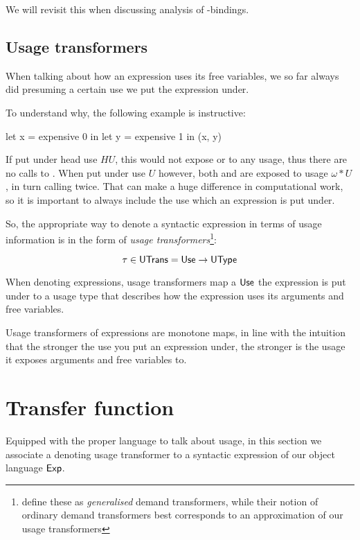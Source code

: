 We will revisit this when discussing analysis of -bindings.

\subsection{Usage transformers}\label{sec:utrans}

When talking about how an expression uses its free variables, we so far always did presuming a certain use we put the expression under.

To understand why, the following example is instructive:

\begin{haskellcode}
let x = expensive 0
in let y = expensive 1
   in (x, y)
\end{haskellcode}

If put under head use $HU$, this would not expose  or  to any usage, thus there are no calls to .
When put under use $U$ however, both  and  are exposed to usage $\omega*U$, in turn calling  twice.
That can make a huge difference in computational work, so it is important to always include the use which an expression is put under.

So, the appropriate way to denote a syntactic expression in terms of usage information is in the form of \emph{usage transformers}\footnote{\textcite{card} define these as \emph{generalised} demand transformers, while their notion of ordinary demand transformers best corresponds to an approximation of our usage transformers}:

\[
\tau \in \text{\textsf{UTrans}} = \text{\textsf{Use}} \to \text{\textsf{UType}}
\]

When denoting expressions, usage transformers map a $\text{\textsf{Use}}$ the expression is put under to a usage type that describes how the expression uses its arguments and free variables.

Usage transformers of expressions are monotone maps, in line with the intuition that the stronger the use you put an expression under, the stronger is the usage it exposes arguments and free variables to.

\section{Transfer function}\label{sec:transfer}

Equipped with the proper language to talk about usage, in this section we associate a denoting usage transformer to a syntactic expression of our object language $\text{\textsf{Exp}}$.

